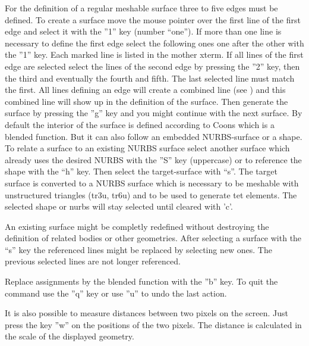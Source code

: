 \documentclass{article}
\begin{document}
For the definition of a regular meshable surface three to five edges must be
defined. To create a surface move the mouse pointer over the first line of the
first edge and select it with the ''1'' key (number ``one''). If more than one
line is necessary to define the first edge select the following ones one after
the other with the ''1'' key. Each marked line is listed in the mother
xterm. If all lines of the first edge are selected select the lines of the
second edge by pressing the ''2'' key, then the third and eventually the
fourth and fifth. The last selected line must match the first. All lines
defining an edge will create a combined line (see ) and
this combined line will show up in the definition of the surface. Then
generate the surface by pressing the ''g'' key and you might continue with the
next surface. By default the interior of the surface is defined according to
Coons \cite{Coons} which is a blended function. But it can also follow an
embedded NURBS-surface or a shape. To relate a surface to an existing NURBS
surface select another surface which already uses the desired NURBS with the
''S'' key (uppercase) or to reference the shape with the ``h'' key. Then
select the target-surface with ``s''. The target surface is converted to a
NURBS surface which is necessary to be meshable with unstructured triangles
(tr3u, tr6u) and to be used to generate tet elements. The selected shape or nurbs will stay selected until cleared with 'c'.

An existing surface might be completly redefined without destroying the definition of related bodies or other geometries. After selecting a surface with the ``s'' key the referenced lines might be replaced by selecting new ones. The previous selected lines are not longer referenced.

Replace assignments by the blended function with the ''b'' key. To quit the command use the ''q'' key or use ''u'' to undo the last action. 

It is also possible to measure distances between two pixels on the screen. Just press the key ''w'' on the positions of the two pixels. The distance is calculated in the scale of the displayed geometry. 
\end{document}
